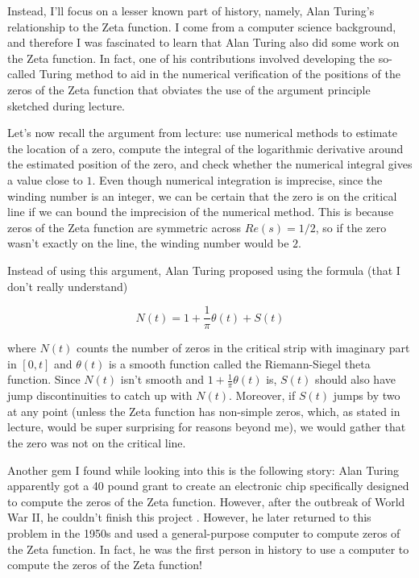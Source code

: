 \documentclass{article}
\theoremstyle{definition}
\begin{document}
Instead, I'll focus on a lesser known part of history, namely, Alan Turing's
relationship to the Zeta function. 
I come from a computer science background, and therefore I was fascinated to learn
that Alan Turing also did some work on the Zeta function. In fact, one of
his contributions involved developing the so-called Turing method to aid in the
numerical verification of the positions of the zeros of the Zeta function
that obviates the use of the argument principle sketched during lecture.

Let's now recall the argument from lecture: use numerical methods to estimate the location
of a zero, compute the integral of the logarithmic derivative around the estimated position of the zero, 
and check whether the numerical integral gives a value close to $ 1 $. Even though numerical integration is imprecise,
since the winding number is an integer, we can be certain that the zero is on
the critical line if we can bound the imprecision of the numerical method. This is because 
zeros of the Zeta function are symmetric across $ Re(s) = 1/2 $, so if the zero wasn't exactly 
on the line, the winding number would be $ 2 $.

Instead of using this argument, Alan Turing proposed using the formula (that I don't really understand)

\[ N(t) = 1 + \frac{1}{\pi} \theta(t) + S(t) \]

where $N(t)$ counts the number of zeros in the critical strip with imaginary part 
in $ [0,t] $ and  $ \theta(t) $ is a smooth function called the Riemann-Siegel theta function.
Since $ N(t) $ isn't smooth and $ 1 + \frac{1}{\pi} \theta(t) $ is, $ S(t) $ should 
also have jump discontinuities to catch up with $ N(t) $. Moreover, if $ S(t) $ jumps 
by two at any point (unless the Zeta function has non-simple zeros, which, as stated in lecture,
would be super surprising for reasons beyond me), we would gather that the zero was not on the
critical line.

Another gem I found while looking into this is the following story: 
Alan Turing apparently got a 40 pound grant to create an electronic chip
specifically designed to compute the zeros of the Zeta function. However, after the
outbreak of World War II, he couldn't finish this project \cite{hejhal_alan_2012}.
However, he later returned to this problem in the 1950s and used a general-purpose computer to 
compute zeros of the Zeta function. In fact, he was the first person in history to use a computer
to compute the zeros of the Zeta function!
\end{document}
